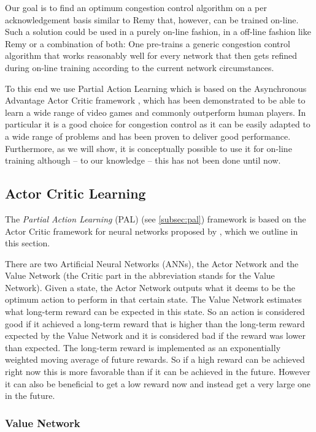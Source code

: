 \documentclass[sigconf]{acmart}
\begin{document}
Our goal is to find an optimum congestion control algorithm on a per acknowledgement basis similar to Remy that, however, can be trained on-line.  Such a solution could be used in a purely on-line fashion, in a off-line fashion like Remy or a combination of both: One pre-trains a generic congestion control algorithm that works reasonably well for every network that then gets refined during on-line training according to the current network circumstances. 

To this end we use Partial Action Learning which is based on the Asynchronous Advantage Actor Critic framework \cite{mnih_asynchronous_2016}, which has been demonstrated to be able to learn a wide range of video games and commonly outperform human players. In particular it is a good choice for congestion control as it can be easily adapted to a wide range of problems and has been proven to deliver good performance. Furthermore, as we will show, it is conceptually possible to use it for on-line training although -- to our knowledge -- this has not been done until now. 

\subsection{Actor Critic Learning}
\label{subsec:ac}

The \textit{Partial Action Learning} (PAL) (see \ref{subsec:pal}) framework is based on the Actor Critic framework for neural networks proposed by \citet{mnih_asynchronous_2016}, which we outline in this section. 

There are two Artificial Neural Networks (ANNs), the Actor Network and the Value Network (the Critic part in the abbreviation stands for the Value Network). Given a state, the Actor Network outputs what it deems to be the optimum action to perform in that certain state. The Value Network estimates what long-term reward can be expected in this state. So an action is considered good if it achieved a long-term reward that is higher than the long-term reward expected by the Value Network and it is considered bad if the reward was lower than expected. The long-term reward is implemented as an exponentially weighted moving average of future rewards. So if a high reward can be achieved right now this is more favorable than if it can be achieved in the future. However it can also be beneficial to get a low reward now and instead get a very large one in the future. 

\subsubsection{Value Network}
\label{subsubsec:genericvalue}
\end{document}
